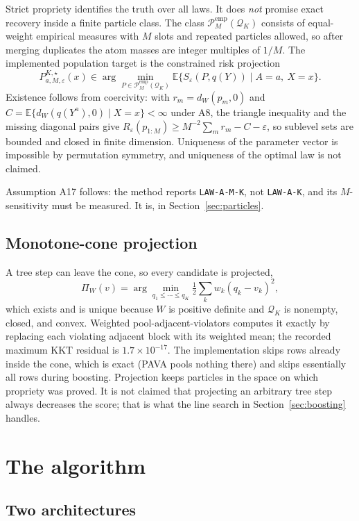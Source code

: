 \documentclass[11pt,a4paper]{article}
\theoremstyle{definition}
\theoremstyle{remark}
\newcommand{\Pcal}{\mathcal{P}}
\newcommand{\Qcal}{\mathcal{Q}}
\newcommand{\Exp}{\mathbb{E}}
\newcommand{\dW}{d_W}
\begin{document}
Strict propriety identifies the truth over all laws. It does \emph{not} promise
exact recovery inside a finite particle class. The class
$\Pcal_M^{\mathrm{emp}}(\Qcal_K)$ consists of equal-weight empirical measures
with $M$ slots and repeated particles allowed, so after merging duplicates the
atom masses are integer multiples of $1/M$. The implemented population target is
the constrained risk projection
\[
P_{a,M,\varepsilon}^{K,\star}(x)
\in \arg\min_{P \in \Pcal_M^{\mathrm{emp}}(\Qcal_K)}
\Exp\{S_\varepsilon(P, q(Y)) \mid A = a,\ X = x\} .
\]
Existence follows from coercivity: with $r_m = \dW(p_m, 0)$ and
$C = \Exp\{\dW(q(Y^a), 0) \mid X = x\} < \infty$ under A8, the triangle
inequality and the missing diagonal pairs give
$R_\varepsilon(p_{1:M}) \geq M^{-2}\sum_m r_m - C - \varepsilon$, so sublevel
sets are bounded and closed in finite dimension. Uniqueness of the parameter
vector is impossible by permutation symmetry, and uniqueness of the optimal law
is not claimed.

Assumption A17 follows: the method reports \texttt{LAW-A-M-K}, not
\texttt{LAW-A-K}, and its $M$-sensitivity must be measured. It is, in
Section~\ref{sec:particles}.

\subsection{Monotone-cone projection}

A tree step can leave the cone, so every candidate is projected,
\[
\Pi_W(v) = \arg\min_{q_1 \leq \cdots \leq q_K} \tfrac12 \sum_k w_k (q_k - v_k)^2 ,
\]
which exists and is unique because $W$ is positive definite and $\Qcal_K$ is
nonempty, closed, and convex. Weighted pool-adjacent-violators computes it
exactly by replacing each violating adjacent block with its weighted mean; the
recorded maximum KKT residual is $1.7 \times 10^{-17}$. The implementation
skips rows already inside the cone, which is exact (PAVA pools nothing there)
and skips essentially all rows during boosting. Projection keeps particles in the
space on which propriety was proved. It is not claimed that projecting an
arbitrary tree step always decreases the score; that is what the line search in
Section~\ref{sec:boosting} handles.

\section{The algorithm}
\label{sec:algo}

\subsection{Two architectures}
\end{document}
